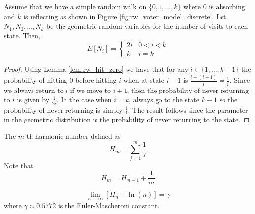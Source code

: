 \begin{theorem}
Assume that we have a simple random walk on $\{0,1,\ldots, k\}$ where 0 is absorbing and $k$ is reflecting as shown in Figure \ref{fig:rw_voter_model_discrete}.
Let $N_1, N_2, \ldots, N_k$ be the geometric random variables for the number of visits to each state.
Then,
$$
E[N_i] = \begin{cases}
    2i & 0 < i < k\\
    k & i = k
\end{cases}
$$
\end{theorem}

\begin{proof}
Using Lemma \ref{lem:rw_hit_zero} we have that for any $i \in \{1, \ldots, k - 1\}$ the probability of hitting 0 before hitting $i$ when at state $i - 1$ is $\frac{i - (i - 1)}{i} = \frac{1}{i}$.
Since we always return to $i$ if we move to $i + 1$, then the probability of never returning to $i$ is given by $\frac{1}{2i}$.
In the case when $i = k$, always go to the state $k - 1$ so the probability of never returning is simply $\frac{1}{k}$.
The result follows since the parameter in the geometric distribution is the probability of never returning to the state.
\end{proof}

\begin{defn}
The $m$-th harmonic number defined as
$$
H_m = \sum_{j = 1}^m \frac{1}{j}
$$
Note that
$$
H_m = H_{m - 1} + \frac{1}{m}
$$
\end{defn}

\begin{theorem}\label{thm:euler_harm_lim}
$$
\lim_{n \to \infty} [H_n - \ln(n)] = \gamma
$$
where $\gamma \approx 0.5772$ is the Euler-Mascheroni constant.
\end{theorem}


